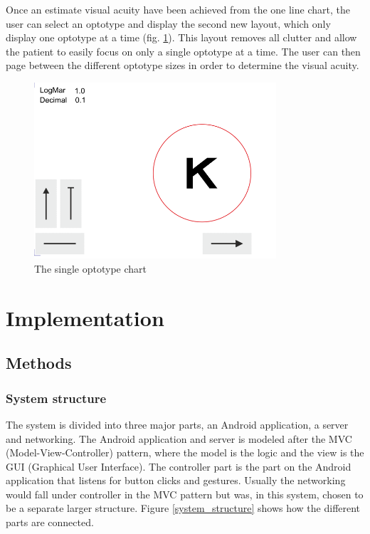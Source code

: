 \documentclass[12pt,a4paper,notitlepage]{report}
\begin{document}
Once an estimate visual acuity have been achieved from the one line chart, the user can select an optotype and display the second new layout, which only display one optotype at a time (fig. \ref{fig:etdrs_single}). This layout removes all clutter and allow the patient to easily focus on only a single optotype at a time. The user can then page between the different optotype sizes in order to determine the visual acuity.

\begin{figure}[ht!  ]
\centering
\includegraphics[width=90mm]{images/etdrs_single.png}
\caption{The single optotype chart}
\label{fig:etdrs_single}
\end{figure}

\chapter{Implementation}
\section{Methods}
\subsection{System structure}
The system is divided into three major parts, an Android application, a server and networking. The Android application and server is modeled after the MVC (Model-View-Controller) pattern, where the model is the logic and the view is the GUI (Graphical User Interface). The controller part is the part on the Android application that listens for button clicks and gestures. Usually the networking would fall under controller in the MVC pattern but was, in this system, chosen to be a separate larger structure. Figure \ref{system_structure} shows how the different parts are connected.
\end{document}
